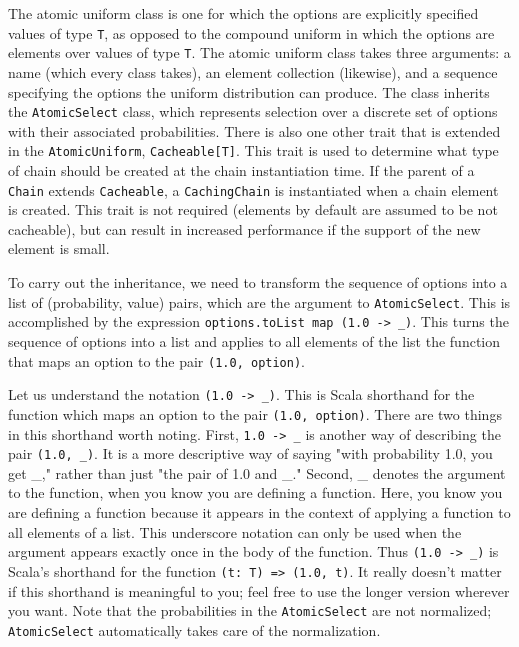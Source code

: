 The atomic uniform class is one for which the options are explicitly specified values of type \texttt{T}, as opposed to the compound uniform in which the options are elements over values of type \texttt{T}. The atomic uniform class takes three arguments: a name (which every class takes), an element collection (likewise), and a sequence specifying the options the uniform distribution can produce. The class inherits the \texttt{AtomicSelect} class, which represents selection over a discrete set of options with their associated probabilities. There is also one other trait that is extended in the \texttt{AtomicUniform},
\texttt{Cacheable[T]}. This trait is used to determine what type of chain should be created at the chain instantiation time. If the parent of a \texttt{Chain} extends \texttt{Cacheable}, a \texttt{CachingChain} is instantiated when a chain element is created. This trait is not required (elements by default are assumed to be not cacheable), but can result in increased performance if the support of the new element is small.

To carry out the inheritance, we need to transform the sequence of options into a list of (probability, value) pairs, which are the argument to \texttt{AtomicSelect}. This is accomplished by the expression \texttt{options.toList map (1.0 -> \_)}. This turns the sequence of options into a list and applies to all elements of the list the function that maps an option to the pair \texttt{(1.0, option)}.

Let us understand the notation \texttt{(1.0 -> \_)}. This is Scala shorthand for the function which maps an option to the pair \texttt{(1.0, option)}. There are two things in this shorthand worth noting. First, \texttt{1.0 -> \_} is another way of describing the pair \texttt{(1.0, \_)}.   It is a more descriptive way of saying "with probability 1.0, you get \_," rather than just "the pair of 1.0 and \_."   Second, \_ denotes the argument to the function, when you know
you are defining a function. Here, you know you are defining a function because it
appears in the context of applying a function to all elements of a list. This underscore notation can only be used when the argument appears exactly once in the body of the function. Thus \texttt{(1.0 -> \_)} is Scala's shorthand for the function \texttt{(t: T) => (1.0, t)}. It really doesn't matter if this shorthand is meaningful to you; feel free to use the longer version wherever you want. Note that the probabilities in the \texttt{AtomicSelect} are not normalized; \texttt{AtomicSelect} automatically takes care of the normalization.

